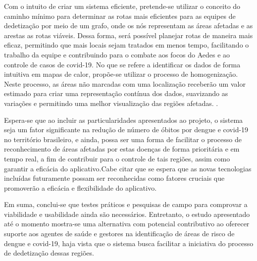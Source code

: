 Com o intuito de criar um sistema eficiente, pretende-se utilizar o conceito do caminho mínimo para determinar as rotas mais eficientes para as equipes de dedetização por meio de um grafo, onde os nós representam as áreas afetadas e as arestas as rotas viáveis. Dessa forma, será possível planejar rotas de maneira mais eficaz, permitindo que mais locais sejam tratados em menos tempo, facilitando o trabalho da equipe e contribuindo para o combate aos focos do Aedes e ao controle de casos de covid-19. No que se refere a identificar os dados de forma intuitiva em mapas de calor, propõe-se utilizar o processo de homogenização. Neste processo, as áreas não marcadas com uma localização receberão um valor estimado para criar uma representação contínua dos dados, suavizando as variações e permitindo uma melhor visualização das regiões afetadas. \cite{25}. \cite{26}

Espera-se que ao incluir as particularidades apresentados ao projeto, o sistema seja um fator significante na redução de número de óbitos por dengue e covid-19 no território brasileiro, e ainda, possa ser uma forma de facilitar o processo de reconhecimento de áreas afetadas por estas doenças de forma prioritária e em tempo real, a fim de contribuir para o controle de tais regiões, assim como garantir a eficácia do aplicativo.Cabe citar que se espera que as novas tecnologias incluídas futuramente possam ser reconhecidas como fatores cruciais que promoverão a eficácia e flexibilidade do aplicativo.

Em suma, conclui-se que testes práticos e pesquisas de campo para comprovar a viabilidade e usabilidade ainda são necessários. Entretanto, o estudo apresentado até o momento mostra-se uma alternativa com potencial contributivo ao oferecer suporte aos agentes de saúde e gestores na identificação de áreas de risco de dengue e covid-19, haja vista que o sistema busca facilitar a iniciativa do processo de dedetização dessas regiões.